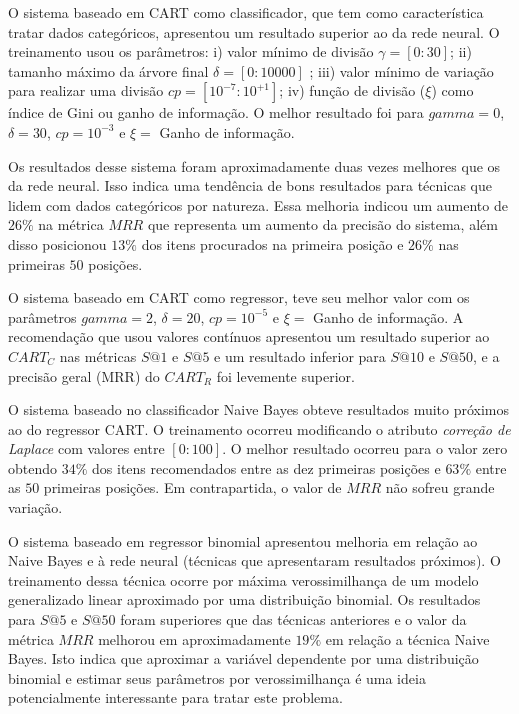 \documentclass[10pt,letterpaper]{article}
\begin{document}
O sistema baseado em CART como classificador, que tem como característica tratar dados categóricos, apresentou um resultado superior ao da rede neural. O treinamento usou os parâmetros: i) valor mínimo de divisão \(\gamma = [0:30]\); ii) tamanho máximo da árvore final \(\delta = [0:10000]\) ; iii) valor mínimo de variação para realizar uma divisão \(cp = [10^{-7}:10^{+1}]\); iv) função de divisão (\(\xi\)) como índice de Gini ou ganho de informação. O melhor resultado foi para \(gamma = 0\), \(\delta = 30\), \(cp = 10^{-3}\) e \(\xi = \) Ganho de informação. 

Os resultados desse sistema foram aproximadamente duas vezes melhores que os da rede neural. Isso indica uma tendência de bons resultados para técnicas que lidem com dados categóricos por natureza. Essa melhoria indicou um aumento de \(26\%\) na métrica \(MRR\) que representa um aumento da precisão do sistema, além disso posicionou \(13\%\) dos itens procurados na primeira posição e \(26\%\) nas primeiras \(50\) posições.

O sistema baseado em CART como regressor, teve seu melhor valor com os parâmetros \(gamma = 2\), \(\delta = 20\), \(cp = 10^{-5}\) e \(\xi = \) Ganho de informação. A recomendação que usou valores contínuos apresentou um resultado superior ao \(CART_{C}\) nas métricas \(S@1\) e \(S@5\) e um resultado inferior para \(S@10\) e \(S@50\), e a precisão geral (MRR) do \(CART_R\) foi levemente superior.

O sistema baseado no classificador Naive Bayes obteve resultados muito próximos ao do regressor CART. O treinamento ocorreu modificando o atributo \emph{correção de Laplace} com valores entre \([0:100]\). O melhor resultado ocorreu para o valor zero obtendo \(34\%\) dos itens recomendados entre as dez primeiras posições e \(63\%\) entre as \(50\) primeiras posições. Em contrapartida, o valor de \(MRR\) não sofreu grande variação.

O sistema baseado em regressor binomial apresentou melhoria em relação ao Naive Bayes e à rede neural (técnicas que apresentaram resultados próximos). O treinamento dessa técnica ocorre por máxima verossimilhança de um modelo generalizado linear aproximado por uma distribuição binomial. Os resultados para \(S@5\) e \(S@50\) foram superiores que das técnicas anteriores e o valor da métrica \(MRR\) melhorou em aproximadamente \(19\%\) em relação a técnica Naive Bayes. Isto indica que aproximar a variável dependente por uma distribuição binomial e estimar seus parâmetros por verossimilhança é uma ideia potencialmente interessante para tratar este problema.
\end{document}
